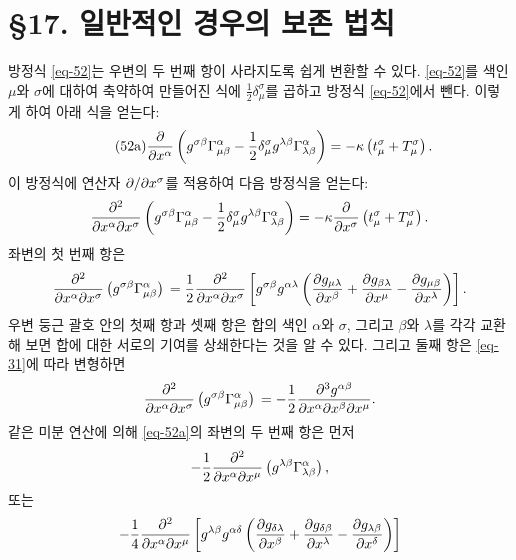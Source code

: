 \section*{\S 17. 일반적인 경우의 보존 법칙}
방정식 \eqref{eq-52}는 우변의 두 번째 항이 사라지도록 쉽게 변환할 수 있다. \eqref{eq-52}를 색인 $\mu$와 $\sigma$에 대하여 축약하여 만들어진 식에 $\frac{1}{2}\delta_\mu^\sigma$를 곱하고 방정식 \eqref{eq-52}에서 뺀다. 이렇게 하여 아래 식을 얻는다:
\begin{equation} \tag{52a} \label{eq-52a}
	{\frac{{\partial}{}}{{\partial}{x^\alpha}}} \left( g^{\sigma\beta} \Gamma_{\mu\beta}^{\alpha}
	-\frac{1}{2} \delta_\mu^\sigma g^{\lambda\beta} \Gamma_{\lambda\beta}^{\alpha} \right)
	= -\kappa\left( t_\mu^\sigma+T_\mu^\sigma \right).
\end{equation} 
이 방정식에 연산자 ${{{\partial}{}}/{{\partial}{x^\sigma}}}$를 적용하여 다음 방정식을 얻는다:
\begin{equation*}
	{\frac{{\partial^2}{}}{{\partial}{x^\alpha}{\partial}{x^\sigma}}}\left( g^{\sigma\beta} \Gamma_{\mu\beta}^{\alpha}
	-\frac{1}{2} \delta_\mu^\sigma g^{\lambda\beta} \Gamma_{\lambda\beta}^{\alpha} \right)
	= -\kappa {\frac{{\partial}{}}{{\partial}{x^\sigma}}} \left( t_\mu^\sigma+T_\mu^\sigma \right).
\end{equation*}
좌변의 첫 번째 항은
\begin{equation*}
	{\frac{{\partial^2}{}}{{\partial}{x^\alpha}{\partial}{x^\sigma}}}\left( g^{\sigma\beta} \Gamma_{\mu\beta}^{\alpha}\right)\\
	=\frac{1}{2} {\frac{{\partial^2}{}}{{\partial}{x^\alpha}{\partial}{x^\sigma}}}\left[
	g^{\sigma\beta} g^{\alpha\lambda}\left(
	{\frac{{\partial}{g_{\mu\lambda}}}{{\partial}{x^\beta}}}
	+ {\frac{{\partial}{g_{\beta\lambda}}}{{\partial}{x^\mu}}}
	- {\frac{{\partial}{g_{\mu\beta}}}{{\partial}{x^\lambda}}}
	\right) \right].
\end{equation*}
우변 둥근 괄호 안의 첫째 항과 셋째 항은 합의 색인 $\alpha$와 $\sigma$, 그리고 $\beta$와 $\lambda$를 각각 교환해 보면 합에 대한 서로의 기여를 상쇄한다는 것을 알 수 있다. 그리고 둘째 항은 \eqref{eq-31}에 따라 변형하면
\begin{equation} \label{eq-54}
	{\frac{{\partial^2}{}}{{\partial}{x^\alpha}{\partial}{x^\sigma}}}\left( g^{\sigma\beta} \Gamma_{\mu\beta}^{\alpha}\right)\\
	=-\frac{1}{2} {\frac{{\partial^3}{g^{\alpha\beta}}}{{\partial}{x^\alpha}{\partial}{x^\beta}{\partial}{x^\mu}}}.
\end{equation}
같은 미분 연산에 의해 \eqref{eq-52a}의 좌변의 두 번째 항은 먼저
\begin{equation*}
	-\frac{1}{2}{\frac{{\partial^2}{}}{{\partial}{x^\alpha}{\partial}{x^\mu}}} \left( g^{\lambda\beta} \Gamma_{\lambda\beta}^\alpha \right),
\end{equation*}
또는
\begin{equation*}
	-\frac{1}{4}{\frac{{\partial^2}{}}{{\partial}{x^\alpha}{\partial}{x^\mu}}}\left[
	g^{\lambda\beta}g^{\alpha\delta}\left(
	{\frac{{\partial}{g_{\delta\lambda}}}{{\partial}{x^\beta}}}
	+ {\frac{{\partial}{g_{\delta\beta}}}{{\partial}{x^\lambda}}}
	- {\frac{{\partial}{g_{\lambda\beta}}}{{\partial}{x^\delta}}}
	\right)
	\right]
\end{equation*}
